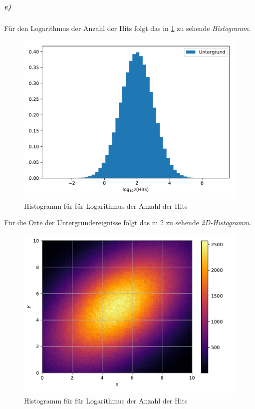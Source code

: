  \subparagraph{e)}
 Für den Logarithmus der Anzahl der Hits folgt das in \ref{fig:13ehits} zu sehende \textit{Histogramm}.
 \begin{figure}[H]
   \includegraphics{Aufgabe13/e_hits.pdf}
   \caption{Histogramm für für Logarithmus der Anzahl der Hits}
   \label{fig:13ehits}
 \end{figure}
 Für die Orte der Untergrundereignisse folgt das in \ref{fig:13edetektor} zu sehende \textit{2D-Histogramm}.
 \begin{figure}[H]
   \includegraphics{Aufgabe13/e_detektor.pdf}
   \caption{Histogramm für für Logarithmus der Anzahl der Hits}
   \label{fig:13edetektor}
 \end{figure}
